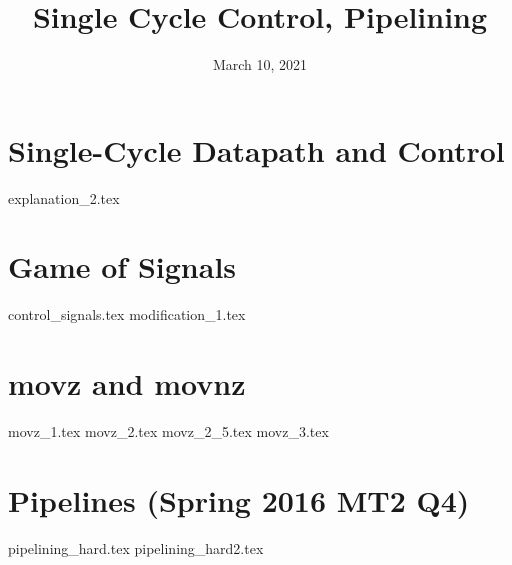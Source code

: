 \documentclass[11pt]{exam}
\title{Single Cycle Control, Pipelining}
\date{March 10, 2021}
\begin{document}
\maketitle

\section{Single-Cycle Datapath and Control}
\begin{questions}
{explanation_2.tex}
\end{questions}
\newpage

\section{Game of Signals}
\begin{questions}
{control_signals.tex}
{modification_1.tex}
\end{questions}
\newpage

\section{movz and movnz}
\begin{questions}
{movz_1.tex}
{movz_2.tex}
{movz_2_5.tex}
{movz_3.tex}
\end{questions}
\newpage

\section{Pipelines (Spring 2016 MT2 Q4)}
\begin{questions}
{pipelining_hard.tex}
{pipelining_hard2.tex}
\end{questions}
\newpage
\end{document}
